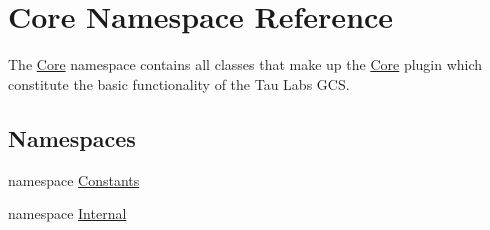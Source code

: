 \hypertarget{namespace_core}{\section{\-Core \-Namespace \-Reference}
\label{namespace_core}
}


\-The \hyperlink{namespace_core}{\-Core} namespace contains all classes that make up the \hyperlink{namespace_core}{\-Core} plugin which constitute the basic functionality of the \-Tau \-Labs \-G\-C\-S.  


\subsection*{\-Namespaces}
\begin{DoxyCompactItemize}
\item 
namespace \hyperlink{namespace_core_1_1_constants}{\-Constants}
\item 
namespace \hyperlink{namespace_core_1_1_internal}{\-Internal}
\end{DoxyCompactItemize}
